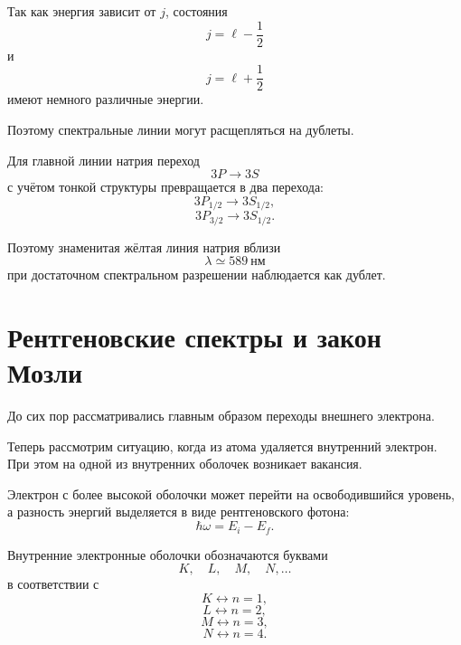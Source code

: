 \documentclass[../final.tex]{subfiles}
\begin{document}
Так как энергия зависит от \(j\), состояния
\begin{equation*}
    j=\ell-\frac12
\end{equation*}
и
\begin{equation*}
    j=\ell+\frac12
\end{equation*}
имеют немного различные энергии.

Поэтому спектральные линии могут расщепляться на дублеты.

Для главной линии натрия переход
\begin{equation*}
    3P\rightarrow3S
\end{equation*}
с учётом тонкой структуры превращается в два перехода:
\begin{equation*}
    3P_{1/2}
    \rightarrow
    3S_{1/2},
\end{equation*}
\begin{equation*}
    3P_{3/2}
    \rightarrow
    3S_{1/2}.
\end{equation*}

Поэтому знаменитая жёлтая линия натрия вблизи
\begin{equation*}
    \lambda\simeq589\ \text{нм}
\end{equation*}
при достаточном спектральном разрешении наблюдается как дублет.

\section{Рентгеновские спектры и закон Мозли}

До сих пор рассматривались главным образом переходы внешнего электрона.

Теперь рассмотрим ситуацию, когда из атома удаляется внутренний электрон.
При этом на одной из внутренних оболочек возникает вакансия.

Электрон с более высокой оболочки может перейти на освободившийся уровень,
а разность энергий выделяется в виде рентгеновского фотона:
\begin{equation*}
    \hbar\omega
    =
    E_i-E_f.
\end{equation*}

Внутренние электронные оболочки обозначаются буквами
\begin{equation*}
    K,\quad L,\quad M,\quad N,\ldots
\end{equation*}
в соответствии с
\begin{equation*}
    K\leftrightarrow n=1,
\end{equation*}
\begin{equation*}
    L\leftrightarrow n=2,
\end{equation*}
\begin{equation*}
    M\leftrightarrow n=3,
\end{equation*}
\begin{equation*}
    N\leftrightarrow n=4.
\end{equation*}
\end{document}

